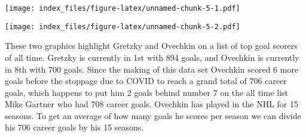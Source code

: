\documentclass[
]{article}
\newenvironment{Shaded}{\begin{snugshade}}{\end{snugshade}}
\newcommand{\DataTypeTok}[1]{\textcolor[rgb]{0.13,0.29,0.53}{#1}}
\newcommand{\DecValTok}[1]{\textcolor[rgb]{0.00,0.00,0.81}{#1}}
\newcommand{\FloatTok}[1]{\textcolor[rgb]{0.00,0.00,0.81}{#1}}
\newcommand{\KeywordTok}[1]{\textcolor[rgb]{0.13,0.29,0.53}{\textbf{#1}}}
\newcommand{\NormalTok}[1]{#1}
\newcommand{\OperatorTok}[1]{\textcolor[rgb]{0.81,0.36,0.00}{\textbf{#1}}}
\newcommand{\StringTok}[1]{\textcolor[rgb]{0.31,0.60,0.02}{#1}}
\begin{document}
\texttt{[image: index\_files/figure-latex/unnamed-chunk-5-1.pdf]}

\begin{Shaded}
\end{Shaded}

\texttt{[image: index\_files/figure-latex/unnamed-chunk-5-2.pdf]}

These two graphics highlight Gretzky and Ovechkin on a list of top goal
scorers of all time. Gretzky is currently in 1st with 894 goals, and
Ovechkin is currently in 8th with 700 goals. Since the making of this
data set Ovechkin scored 6 more goals before the stoppage due to COVID
to reach a grand total of 706 career goals, which happens to put him 2
goals behind number 7 on the all time list Mike Gartner who had 708
career goals. Ovechkin has played in the NHL for 15 seasons. To get an
average of how many goals he scores per season we can divide his 706
career goals by his 15 seasons.
\end{document}
